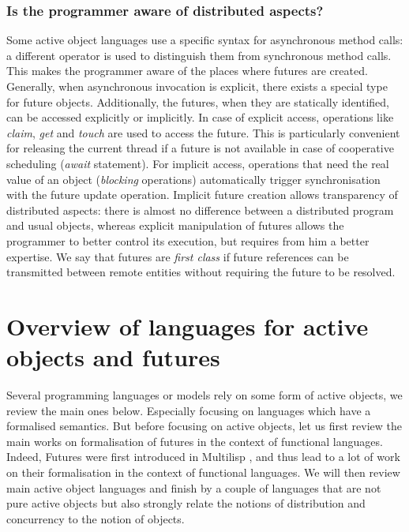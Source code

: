 \subsubsection{Is the programmer aware of distributed aspects?}
Some active object languages use a specific syntax for asynchronous
method calls: a different operator is used to distinguish them from
synchronous method calls. This makes the programmer aware of the
places where futures are created. Generally, when asynchronous
invocation is explicit, there exists a special type for future objects.
Additionally, the futures, when they are statically identified, can be
accessed explicitly or implicitly. In case of explicit access,
operations like \emph{claim}, \emph{get} and \emph{touch} are used to
access the future. This is particularly convenient for releasing the
current thread if a future is not available in case of cooperative
scheduling (\emph{await} statement). For implicit access, operations that need the real
value of an object (\emph{blocking} operations) automatically trigger
synchronisation with the future update operation.
Implicit future creation allows transparency of distributed aspects:
there is almost no difference between a distributed program and usual
objects, whereas explicit manipulation of futures allows the
programmer to better control its execution, but requires from him a
better expertise. We say that futures
are \emph{first class} if future references can be transmitted between
remote entities without requiring the future to be resolved.


\section{Overview of  languages for active objects and futures}\label{sec:overview}
Several programming languages or models rely on some form of active
objects, we review the main ones below. Especially focusing on
languages which have a formalised semantics. But before focusing on
active objects, let us first review the main works on formalisation of
futures in the context of functional languages.
Indeed, Futures
were first introduced in Multilisp \cite{Halstead85}, and thus lead to
a lot of work on their formalisation in the context of 
functional languages. We will then review main active object languages
and finish by a couple of languages that are not pure active objects
but also strongly relate the notions of distribution and concurrency to
the notion of objects.



